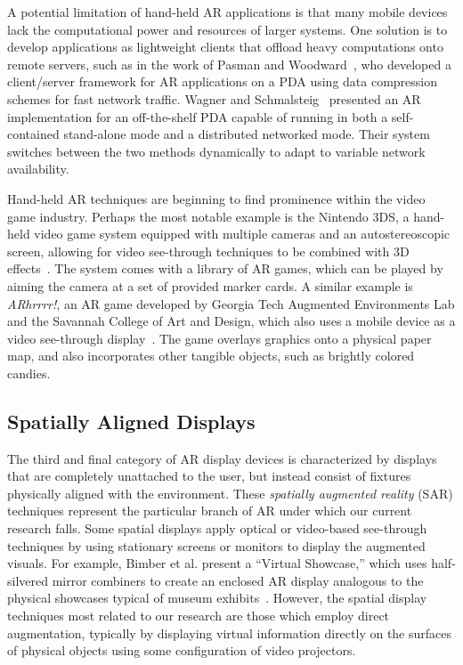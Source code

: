 \documentclass{thesis}
\begin{document}
A potential limitation of hand-held AR applications is that many mobile devices lack the computational power and resources of larger systems. One solution is to develop applications as lightweight clients that offload heavy computations onto remote servers, such as in the work of Pasman and Woodward~\cite{Pasman2003}, who developed a client/server framework for AR applications on a PDA using data compression schemes for fast network traffic. Wagner and Schmalsteig~\cite{Wagner2003} presented an AR implementation for an off-the-shelf PDA capable of running in both a self-contained stand-alone mode and a distributed networked mode. Their system switches between the two methods dynamically to adapt to variable network availability.

Hand-held AR techniques are beginning to find prominence within the video game industry. Perhaps the most notable example is the Nintendo 3DS, a hand-held video game system equipped with multiple cameras and an autostereoscopic screen, allowing for video see-through techniques to be combined with 3D effects~\cite{Nintendo3DS}. The system comes with a library of AR games, which can be played by aiming the camera at a set of provided marker cards. A similar example is \emph{ARhrrrr!}, an AR game developed by Georgia Tech Augmented Environments Lab and the Savannah College of Art and Design, which also uses a mobile device as a video see-through display~\cite{ARhrrrr!}. The game overlays graphics onto a physical paper map, and also incorporates other tangible objects, such as brightly colored candies.

\subsection{Spatially Aligned Displays}

The third and final category of AR display devices is characterized by displays that are completely unattached to the user, but instead consist of fixtures physically aligned with the environment. These \emph{spatially augmented reality} (SAR) techniques represent the particular branch of AR under which our current research falls. Some spatial displays apply optical or video-based see-through techniques by using stationary screens or monitors to display the augmented visuals. For example, Bimber et al. present a ``Virtual Showcase,'' which uses half-silvered mirror combiners to create an enclosed AR display analogous to the physical showcases typical of museum exhibits~\cite{Bimber2005}. However, the spatial display techniques most related to our research are those which employ direct augmentation, typically by displaying virtual information directly on the surfaces of physical objects using some configuration of video projectors.
\end{document}
